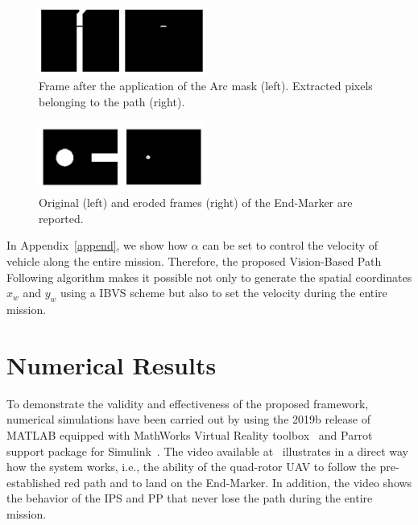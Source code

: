 \documentclass[a4paper,twocolumn,10pt]{article}
\begin{document}
    \begin{figure}
        \centering
        \includegraphics[width=0.49\textwidth]{pics/fig8_frame.png}
        \caption{Frame after the application of the Arc mask (left). Extracted pixels belonging to the 
        path (right).}
        \label{fig:fig8frames}
    \end{figure}
    \begin{figure}
        \centering
        \includegraphics[width=0.49\textwidth]{pics/fig9_frame.png}
        \caption{Original (left) and eroded frames (right) of the End-Marker are reported.}
        \label{fig:fig9frame}
    \end{figure}

    In Appendix~\ref{append}, we show how $\alpha$ can be set to control the velocity of vehicle along the entire mission. Therefore, the proposed Vision-Based Path Following algorithm makes it possible not only to generate the spatial coordinates $x_w$ and $y_w$ using a IBVS scheme but also to set the velocity during the entire mission.

    \section{Numerical Results}
    \label{sec:NumRes}

    To demonstrate the validity and effectiveness of the proposed framework, numerical simulations have been carried out by using the 2019b release of MATLAB equipped with MathWorks Virtual Reality 
    toolbox~\cite{bibItem24} and Parrot support package for Simulink~\cite{bibItem18}. 
    The video available at~\cite{bibItem25} illustrates in a direct way how the system works, i.e., the ability of the quad-rotor UAV to follow the pre-established red path and to land on the End-Marker. In addition, the video shows the behavior of the IPS and PP that never lose the path during the entire mission. 
\end{document}
